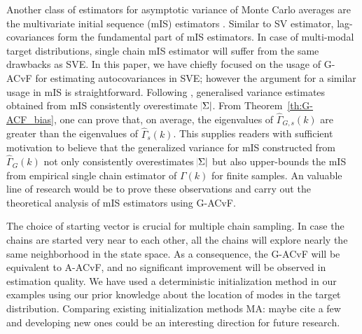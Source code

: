 \documentclass[11pt]{article}
\theoremstyle{remark}
\begin{document}
%

Another class of estimators for asymptotic variance of Monte Carlo averages are the multivariate initial sequence (mIS) estimators \citep{dai:jon:2017}. Similar to SV estimator, lag-covariances form the fundamental part of mIS estimators. In case of multi-modal target distributions, single chain mIS estimator will suffer from the same drawbacks as SVE. In this paper, we have chiefly focused on the usage of G-ACvF for estimating autocovariances in SVE; however the argument for a similar usage in mIS is straightforward.  Following \cite{dai:jon:2017}, generalised variance estimates obtained from mIS consistently overestimate $\abs{\Sigma}$. From Theorem~\ref{th:G-ACF_bias}, one can prove that, on average, the eigenvalues of $\hat{\Gamma}_{G,s}(k)$ are greater than the eigenvalues of $\hat{\Gamma}_s(k)$. This supplies readers with sufficient motivation to believe that the generalized variance for mIS constructed from $\hat{\Gamma}_G(k)$ not only consistently overestimates $\abs{\Sigma}$ but also upper-bounds the mIS from empirical single chain estimator of $\Gamma(k)$ for finite samples. An valuable line of research would be to prove these observations and carry out the theoretical analysis of mIS estimators using G-ACvF. 
%

The choice of starting vector is crucial for multiple chain sampling. In case the chains are started very near to each other, all the chains will explore nearly the same neighborhood in the state space. As a consequence, the G-ACvF will be equivalent to A-ACvF, and no significant improvement will be observed in estimation quality. We have used a deterministic initialization method in our examples using our prior knowledge about the location of modes in the target distribution. Comparing existing initialization methods {\color{orange} MA: maybe cite a few} and developing new ones could be an interesting direction for future research.  
\end{document}
